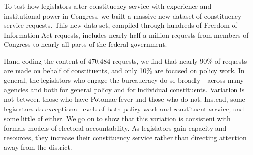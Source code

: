 \documentclass[12pt]{article}
\begin{document}




To test how legislators alter constituency service with experience and institutional power in Congress, we built a massive new dataset of constituency service requests. This new data set, compiled through hundreds of Freedom of Information Act requests, includes nearly half a million requests from members of Congress to nearly all parts of the federal government. 

Hand-coding the content of 470,484 requests, we find that nearly 90\% of requests are made on behalf of constituents, and only 10\% are focused on policy work. 
In general, the legislators who engage the bureaucracy do so broadly---across many agencies and both for general policy and for individual constituents.  Variation is not between those who have Potomac fever and those who do not. Instead, some legislators do exceptional levels of both policy work and constituent service, and some little of either. We go on to show that this variation is consistent with formals models of electoral accountability. As legislators gain capacity and resources, they increase their constituency service rather than directing attention away from the district. 

\end{document}
